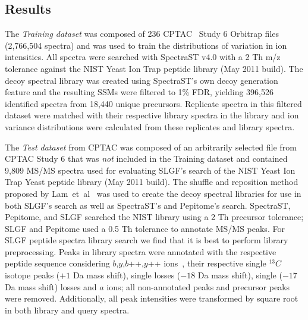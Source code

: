 \documentclass[endnotes,11pt]{article}
\begin{document}
\subsection*{Results}

The {\em Training dataset} was composed of 236 CPTAC~\cite{paulovich10,tabb10} Study 6 Orbitrap files (2,766,504 spectra) and was used to train the distributions of variation in ion intensities. All spectra were searched with SpectraST v4.0 with a 2 Th m/z tolerance against the NIST Yeast Ion Trap peptide library (May 2011 build). The decoy spectral library was created using SpectraST's own decoy generation feature and the resulting SSMs were filtered to 1\% FDR, yielding 396,526 identified spectra from 18,440 unique precursors. Replicate spectra in this filtered dataset were matched with their respective library spectra in the library and ion variance distributions were calculated from these replicates and library spectra.

The {\em Test dataset} from CPTAC was composed of an arbitrarily selected file from CPTAC Study 6 that was \emph{not} included in the Training dataset and contained 9,809 MS/MS spectra used for evaluating SLGF's search of the NIST Yeast Ion Trap Yeast peptide library (May 2011 build). The shuffle and reposition method proposed by Lam~et~al~\cite{lam10} was used to create the decoy spectral libraries for use in both SLGF's search as well as SpectraST's and Pepitome's search. SpectraST, Pepitome, and SLGF searched the NIST library using a 2 Th precursor tolerance; SLGF and Pepitome used a 0.5 Th tolerance to annotate MS/MS peaks.
%
For SLGF peptide spectra library search we find that it is best to perform library preprocessing. Peaks in library spectra were annotated with the respective peptide sequence considering $b$,$y$,$b$++,$y$++ ions~\cite{Roepstorff84}, their respective single $^{13}C$ isotope peaks ($+1$ Da mass shift), single  losses ($-18$ Da mass shift), single  ($-17$ Da mass shift) losses and $a$ ions; all non-annotated peaks and precursor peaks were removed. Additionally, all peak intensities were transformed by square root in both library and query spectra.
\end{document}
